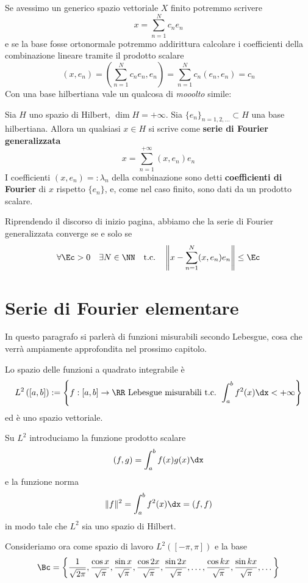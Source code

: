 Se avessimo un generico spazio vettoriale $X$ finito potremmo scrivere
$$
x=\sum_{n=1}^Nc_ne_n
$$
e se la base fosse ortonormale potremmo addirittura calcolare i coefficienti della combinazione lineare tramite il prodotto scalare
$$
(x,e_n)=\left(\sum_{n=1}^Nc_ne_n,e_n\right)=\sum_{n=1}^Nc_n(e_n,e_n)=c_n
$$
Con una base hilbertiana vale un qualcosa di \textit{mooolto} simile:
\begin{thm}
\label{teoHNOsepa}
Sia $H$ uno spazio di Hilbert, $\dim H=+\infty$. Sia $\{e_n\}_{n=1,2,\dots}\subset H$ una base hilbertiana. Allora un qualsiasi $x\in H$ si scrive come \textbf{serie di Fourier generalizzata}
\begin{equation*}
\boxed{x = \sum^{+\infty}_{n = 1}(x, e_{n}) e_{n}}
\end{equation*}
I coefficienti $(x,e_n)=:\lambda_n$ della combinazione sono detti \textbf{coefficienti di Fourier} di $x$ rispetto $\{e_n\}$, e, come nel caso finito, sono dati da un prodotto scalare.
\end{thm}

Riprendendo il discorso di inizio pagina, abbiamo che la serie di Fourier generalizzata converge se e solo se
$$
\forall\Ec>0 \quad \exists N\in \NN \quad \text{t.c.}\quad \left\|x-\sum_{n=1}^N(x,e_n)e_n\right\|\leq \Ec
$$

\newpage

\section{Serie di Fourier elementare}

In questo paragrafo si parlerà di funzioni misurabili secondo Lebesgue, cosa che verrà ampiamente approfondita nel prossimo capitolo.

\begin{defn}
Lo spazio delle funzioni a quadrato integrabile è
$$L^2\left([a,b]\right):=\left\{f:[a,b]\to\RR\text{ Lebesgue misurabili t.c. }\displaystyle\int_a^bf^2(x)\dx<+\infty \right\}$$
ed è uno spazio vettoriale.
\end{defn}
Su $L^2$ introduciamo la funzione prodotto scalare
\begin{equation*}
(f,g)=\int_a^bf(x)g(x)\dx
\end{equation*}
e la funzione norma
\begin{equation*}
\Vert f \Vert ^2=\int_a^bf^2(x)\dx=(f,f)
\end{equation*}
in modo tale che $L^2$ sia uno spazio di Hilbert.

Consideriamo ora come spazio di lavoro $L^{2}([ - \pi, \pi])$ e la base
\begin{equation*}
\Bc = \left\{\frac{1}{\sqrt{2\pi}}, \frac{\cos x}{\sqrt{\pi}}, \frac{\sin x}{\sqrt{\pi}}, \frac{\cos2x}{\sqrt{\pi}}, \frac{\sin2x}{\sqrt{\pi}}, \dotsc, \frac{\cos kx}{\sqrt{\pi}}, \frac{\sin kx}{\sqrt{\pi}}, \dotsc  \right\}
\end{equation*}

